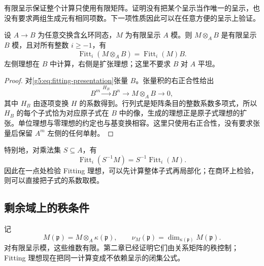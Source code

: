 有限呈示保证整个计算只使用有限矩阵。证明没有把某个呈示当作唯一的呈示，也没有要求两组生成元有相同项数。下一项性质因此可以在任意方便的呈示上验证。

\begin{proposition}\label{g5:prop:fitting-base-change}
	设 \(A\to B\) 为任意交换含幺环同态，\(M\) 为有限呈示 \(A\) 模。则 \(M\otimes_A B\) 是有限呈示 \(B\) 模，且对所有整数 \(i\geq-1\)，有
	\[
		\operatorname{Fitt}_i(M\otimes_A B)
		=\operatorname{Fitt}_i(M)B.
	\]
	左侧理想在 \(B\) 中计算，右侧是扩张理想；这里不要求 \(B\) 对 \(A\) 平坦。
\end{proposition}
\begin{proof}
	对\eqref{g5:eq:fitting-presentation}张量 \(B\)。张量积的右正合性给出
	\[
		B^m\xrightarrow{H_B}B^n
		\longrightarrow M\otimes_A B\longrightarrow0,
	\]
	其中 \(H_B\) 由逐项变换 \(H\) 的系数得到。行列式是矩阵条目的整数系数多项式，所以 \(H_B\) 的每个子式恰为对应原子式在 \(B\) 中的像，生成的理想正是原子式理想的扩张。单位理想与零理想的约定也与基变换相容。这里只使用右正合性，没有要求张量后保留 \(A^m\) 左侧的任何单射。
\end{proof}

特别地，对乘法集 \(S\subseteq A\)，有
\[
	\operatorname{Fitt}_i(S^{-1}M)
	=S^{-1}\operatorname{Fitt}_i(M).
\]
因此在一点处检验 Fitting 理想，可以先计算整体子式再局部化；在商环上检验，则可以直接把子式的系数取模。

\subsection{剩余域上的秩条件}
\label{g5:subsec:0602:03}

记
\[
	M(\mathfrak p)=M\otimes_A\kappa(\mathfrak p),\qquad
	\nu_M(\mathfrak p)=\dim_{\kappa(\mathfrak p)}M(\mathfrak p).
\]
对有限呈示模，这些维数有限。第二章已经证明它们由关系矩阵的秩控制；Fitting 理想现在把同一计算变成不依赖呈示的闭集公式。

